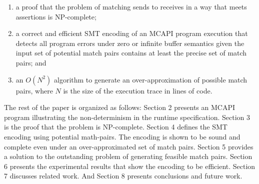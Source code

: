 \begin{enumerate}
\item a proof that the problem of matching sends to receives in a way that meets assertions is NP-complete;
\item a correct and efficient SMT encoding of an MCAPI program
  execution that detects all program errors under zero or infinite
  buffer semantics given the input set of potential match pairs
  contains at least the precise set of match pairs; and
\item an $O(N^2)$ algorithm to generate an over-approximation of
  possible match pairs, where $N$ is the size of the execution trace
  in lines of code.
\end{enumerate}

The rest of the paper is organized as follows: Section 2 presents an
MCAPI program illustrating the non-determinism in the runtime
specification. Section 3 is the proof that the problem is
NP-complete. Section 4 defines the SMT encoding using potential
math-pairs. The encoding is shown to be sound and complete even under
an over-approximated set of match pairs. Section 5 provides a solution
to the outstanding problem of generating feasible match pairs. Section
6 presents the experimental results that show the encoding to be
efficient. Section 7 discusses related work. And Section 8 presents
conclusions and future work.

